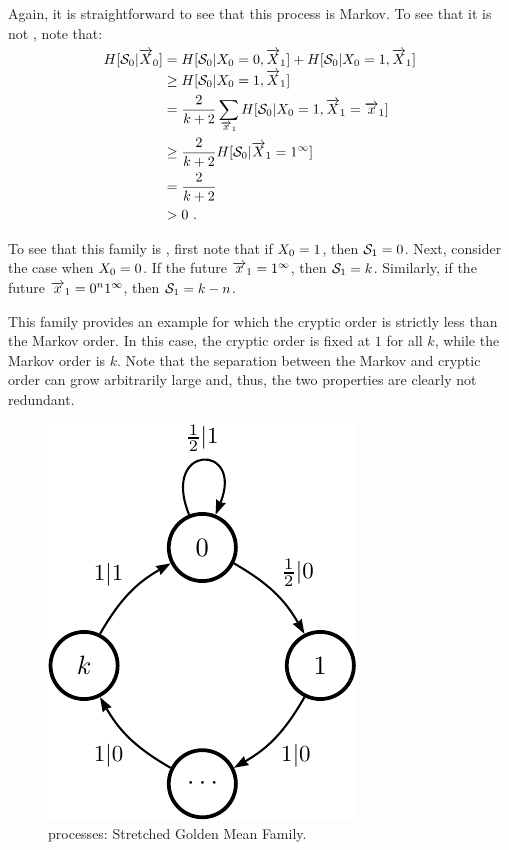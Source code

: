 Again, it is straightforward to see that this process is  Markov. To
see that it is not , note that:
\begin{align*}
H[\mathcal{S}_0 | \smash{\overrightarrow{{X}}}_0] 
    &= H[\mathcal{S}_0 | {X}_0=0, \smash{\overrightarrow{{X}}}_1]
      +H[\mathcal{S}_0 | {X}_0=1, \smash{\overrightarrow{{X}}}_1]\\
    &\geq H[\mathcal{S}_0 | {X}_0=1, \smash{\overrightarrow{{X}}}_1]\\
    &=\frac{2}{k+2}\sum_{\smash{\overrightarrow{{x}}}_1} H[\mathcal{S}_0 | {X}_0=1, \smash{\overrightarrow{{X}}}_1=\smash{\overrightarrow{{x}}}_1]\\
    &\geq \frac{2}{k+2} H[\mathcal{S}_0 | \smash{\overrightarrow{{X}}}_1 = 1^\infty]\\
    &= \frac{2}{k+2} \\
    &> 0 ~.
\end{align*}

To see that this family is , first note that if ${X}_0 = 1$, then
$\mathcal{S}_1=0$. Next, consider the case when ${X}_0 = 0$. If the
future $\smash{\overrightarrow{{x}}}_1 = 1^\infty$, then $\mathcal{S}_1 = k$. Similarly, if the
future $\smash{\overrightarrow{{x}}}_1 = 0^n1^\infty$, then $\mathcal{S}_1 = k-n$. 

This family
provides an example for which the cryptic order is strictly less
than the Markov order.  In this case, the cryptic order is fixed at $1$ for
all $k$, while the Markov order is $k$.  Note that the separation between the 
Markov and cryptic order can grow arbitrarily large and, thus, the two
properties are clearly not redundant.

\begin{figure}[th]
\centering
\includegraphics{../chapter3/figures/stretchedgm}
\caption{ processes: Stretched Golden Mean Family.}
\label{fig:StretchedGM}
\end{figure}

